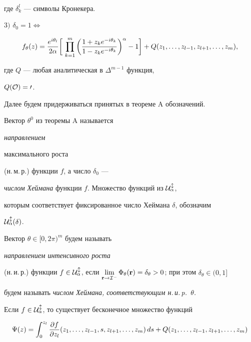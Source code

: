 {\begin{align*}
\end{align*}


где $\delta^l_k$ --- символы Кронекера.





$3)$ $\delta_0 =1 \Longleftrightarrow$


$$


f_\theta (z)=\frac


{e^{i\theta_l}}{2\alpha}\bigg[\,\prod_{k=1}^m\bigg(\frac{1+z_ke^


{-i\theta_k}}


{1-z_ke^{-i\theta_k}}\bigg)^\alpha-1\bigg]+Q(z_1,\cd,z_{l-


1},z_{l+1},\cd,z_m),$$


где $Q$ --- любая аналитическая в $\Delta^{m-1}$ функция,


$Q(\cal O)=0$.


}


\medskip





Далее будем придерживаться принятых в теореме A обозначений.


Вектор $\theta^{0}$ из теоремы A называется {\it направлением


максимального роста} (н.\,м.\,р.) функции $f$, а число $\delta_0$ ---


{\it числом Хеймана} функции $f$. Множество функций из $\cal U^l_\alpha$,


которым соответствует фиксированное число Хеймана $\delta$, обозначим


$\cal U^l_\alpha(\delta)$.


Вектор $\theta\in [0,2\pi)^m$ будем называть


{\it направлением интенсивного роста}


(н.\,и.\,р.) функции $f\in\cal U^l_\alpha$, если $\lim\limits_{\bold r\to\cal


I^-}\Phi_\theta (\bold r)=\delta_\theta >0$; при этом $\delta_\theta\in (0,1]$


будем называть {\it числом Хеймана, соответствующим н.\,и.\,p.~$\theta$.}





Если $f\in\cal U^l_\alpha$, то существует бесконечное множество функций


\begin{equation}


\Psi (z)=\int_0^{z_l}\pol (z_1,\cd,z_{l-1},s,z_{l+1},\cd,z_m)\,


ds+Q(z_1,\cd,z_{l-1},z_{l+1},\cd,z_m)


\end{equation}


